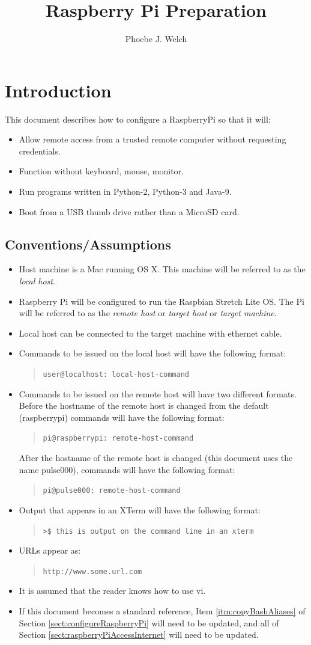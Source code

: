 \documentclass[11pt,oneside]{article}
\title{Raspberry Pi Preparation}
\author{Phoebe J. Welch}
\makeatletter
\newcommand{\localCommand}[1]{\begin{quote} \texttt{user@localhost: #1} \end{quote}}
\newcommand{\remoteCommandBeforeRename}[1]{\begin{quote} \texttt{pi@raspberrypi: #1} \end{quote}}
\newcommand{\remoteCommandAfterRename}[1]{\begin{quote} \texttt{pi@pulse000: #1} \end{quote}}
\newcommand{\myurl}[1]{\begin{quote} \texttt{#1} \end{quote}}
\newcommand{\xtermOutput}[1]{\begin{quote} \texttt{>\$ #1} \end{quote}}
\makeatother
\begin{document}
\maketitle

\section*{Introduction}
This document describes how to configure a RaspberryPi so that it will:
\begin{itemize}
	\item Allow remote access from a trusted remote computer without requesting credentials.
	\item Function without keyboard, mouse, monitor.
	\item Run programs written in Python-2, Python-3 and Java-9.
	\item Boot from a USB thumb drive rather than a MicroSD card.
\end{itemize}
\subsection*{Conventions/Assumptions}
\begin{itemize}
	\item Host machine is a Mac running OS X.  This machine will be referred to as the {\em local host}.
	\item Raspberry Pi will be configured to run the Raspbian Stretch Lite OS.  The Pi will be referred to as the {\em remote host} or
	{\em target host} or {\em target machine}.
	\item Local host can be connected to the target machine with ethernet cable.
	\item Commands to be issued on the local host will have the following format: \localCommand{local-host-command}
	\item Commands to be issued on the remote host will have two different formats.  Before the hostname of the remote host is changed
	from the default (raspberrypi) commands will have the following format: \remoteCommandBeforeRename{remote-host-command}  After
	the hostname of the remote host is changed (this document uses the name pulse000), commands will have the following format:
	\remoteCommandAfterRename{remote-host-command}
	\item Output that appears in an XTerm will have the following format: \xtermOutput{this is output on the command line in an xterm}
	\item URLs appear as: \myurl{http://www.some.url.com}
	\item It is assumed that the reader knows how to use vi.
	\item If this document becomes a standard reference, Item \ref{itm:copyBashAliases} of Section \ref{sect:configureRaspberryPi} will need to be updated,
	and all of Section \ref{sect:raspberryPiAccessInternet} will need to be updated.
\end{itemize}
\end{document}
